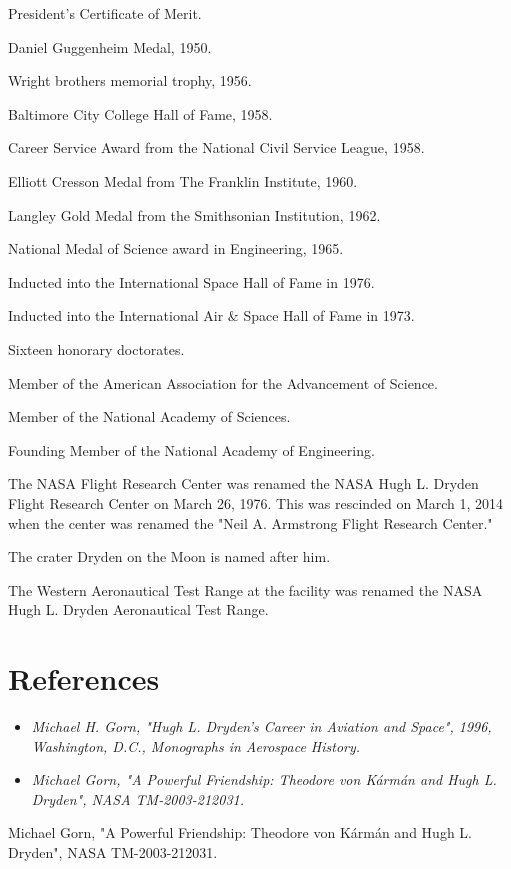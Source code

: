 President's Certificate of Merit.

Daniel Guggenheim Medal, 1950.

Wright brothers memorial trophy, 1956.

Baltimore City College Hall of Fame, 1958.

Career Service Award from the National Civil Service League, 1958.

Elliott Cresson Medal from The Franklin Institute, 1960.

Langley Gold Medal from the Smithsonian Institution, 1962.

National Medal of Science award in Engineering, 1965.

Inducted into the International Space Hall of Fame in 1976.

Inducted into the International Air \& Space Hall of Fame in 1973.

Sixteen honorary doctorates.

Member of the American Association for the Advancement of Science.

Member of the National Academy of Sciences.

Founding Member of the National Academy of Engineering.

The NASA Flight Research Center was renamed the NASA Hugh L. Dryden
Flight Research Center on March 26, 1976. This was rescinded on March 1,
2014 when the center was renamed the "Neil A. Armstrong Flight Research
Center."

The crater Dryden on the Moon is named after him.

The Western Aeronautical Test Range at the facility was renamed the NASA
Hugh L. Dryden Aeronautical Test Range.

\section{References}\label{references}

\begin{itemize}
\item
  \emph{Michael H. Gorn, "Hugh L. Dryden's Career in Aviation and
  Space", 1996, Washington, D.C., Monographs in Aerospace History.}
\item
  \emph{Michael Gorn, "A Powerful Friendship: Theodore von Kármán and
  Hugh L. Dryden", NASA TM-2003-212031.}
\end{itemize}

Michael Gorn, "A Powerful Friendship: Theodore von Kármán and Hugh L.
Dryden", NASA TM-2003-212031.


